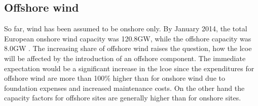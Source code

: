 \documentclass[a4paper, 5p, sort&compress]{elsarticle}%
\begin{document}



\subsection{Offshore wind}
\label{sec:offshore-wind}

So far, wind has been assumed to be onshore only. By January 2014, the
total European onshore wind capacity was 120.8GW, while the offshore
capacity was 8.0GW \cite{EWEA}. %
The increasing share of offshore wind raises the question, how the
\gls{lcoe} will be affected by the introduction of an offshore
component. The immediate expectation would be a significant increase
in the \gls{lcoe} since the expenditures for offshore wind are more than
100\% higher than for onshore wind due to foundation expenses and
increased maintenance costs. On the other hand the capacity factors
for offshore sites are generally higher than for onshore sites.
\end{document}
